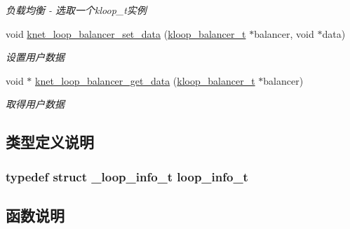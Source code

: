 \begin{DoxyCompactItemize}
\begin{DoxyCompactList}\small\item\em 负载均衡 -\/ 选取一个kloop\+\_\+t实例 \end{DoxyCompactList}\item 
void \hyperlink{a00114_ga476aeb9c1ab507c2af581b9ceb66b261_ga476aeb9c1ab507c2af581b9ceb66b261}{knet\+\_\+loop\+\_\+balancer\+\_\+set\+\_\+data} (\hyperlink{a00054_abd3f964265beb2f8984e76f44fb5ea33_abd3f964265beb2f8984e76f44fb5ea33}{kloop\+\_\+balancer\+\_\+t} $\ast$balancer, void $\ast$data)
\begin{DoxyCompactList}\small\item\em 设置用户数据 \end{DoxyCompactList}\item 
void $\ast$ \hyperlink{a00114_gaf4fab99f76529f2381418ff4f0692a68_gaf4fab99f76529f2381418ff4f0692a68}{knet\+\_\+loop\+\_\+balancer\+\_\+get\+\_\+data} (\hyperlink{a00054_abd3f964265beb2f8984e76f44fb5ea33_abd3f964265beb2f8984e76f44fb5ea33}{kloop\+\_\+balancer\+\_\+t} $\ast$balancer)
\begin{DoxyCompactList}\small\item\em 取得用户数据 \end{DoxyCompactList}\end{DoxyCompactItemize}


\subsection{类型定义说明}
\hypertarget{a00077_a4ae76cfed863999ec747314b93b9287d_a4ae76cfed863999ec747314b93b9287d}{}
\subsubsection[{loop\+\_\+info\+\_\+t}]{\setlength{\rightskip}{0pt plus 5cm}typedef struct {\bf \+\_\+loop\+\_\+info\+\_\+t}  {\bf loop\+\_\+info\+\_\+t}}\label{a00077_a4ae76cfed863999ec747314b93b9287d_a4ae76cfed863999ec747314b93b9287d}


\subsection{函数说明}
\hypertarget{a00114_ga647f8a2d39c97c8759f8768ebc612b98_ga647f8a2d39c97c8759f8768ebc612b98}{}
